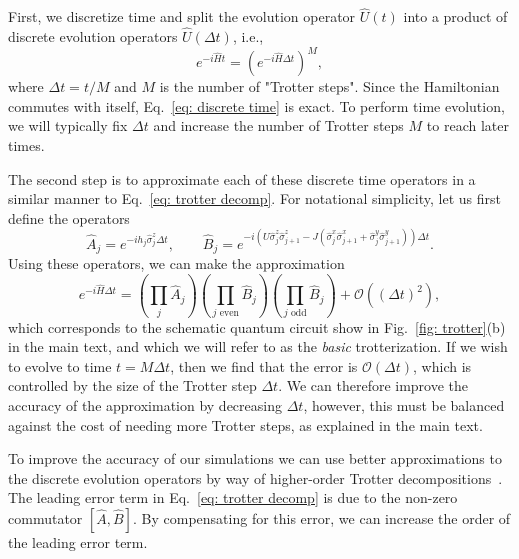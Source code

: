 \documentclass[twocolumn,showpacs,preprintnumbers,nofootinbib,amsmath,aps,pra,longbibliography,amssymb,superscriptaddress]{revtex4-1}
\begin{document}
First, we discretize time and split the evolution operator $\hat{U}(t)$ into a product of discrete evolution operators $\hat{U}(\Delta t)$, i.e.,
\begin{equation}\label{eq: discrete time}
e^{-i\hat{H} t} = \left( e^{-i\hat{H} \Delta t} \right)^M,
\end{equation}
where $\Delta t = t/M$ and $M$ is the number of "Trotter steps". Since the Hamiltonian commutes with itself, Eq.~\eqref{eq: discrete time} is exact. To perform time evolution, we will typically fix $\Delta t$ and increase the number of Trotter steps $M$ to reach later times.

The second step is to approximate each of these discrete time operators in a similar manner to Eq.~\eqref{eq: trotter decomp}. For notational simplicity, let us first define the operators
\begin{equation}
\hat{A}_j = e^{-i h_j \hat{\sigma}^z_j \Delta t}, \qquad \hat{B}_j = e^{-i(U\hat{\sigma}^z_j\hat{\sigma}^z_{j+1}-J(\hat{\sigma}^x_j\hat{\sigma}^x_{j+1} +\hat{\sigma}^y_j\hat{\sigma}^y_{j+1}))\Delta t}.
\end{equation}
Using these operators, we can make the approximation
\begin{equation}
e^{-i\hat{H}\Delta t} =  \left( \prod_{j} \hat{A}_j \right) \left( \prod_{j \text{ even}} \hat{B}_j \right) \left( \prod_{j \text{ odd}} \hat{B}_j \right) + \mathcal{O}((\Delta t)^2),
\end{equation}
which corresponds to the schematic quantum circuit show in Fig.~\ref{fig: trotter}(b) in the main text, and which we will refer to as the \emph{basic} trotterization. If we wish to evolve to time $t = M\Delta t$, then we find that the error is $\mathcal{O}(\Delta t)$, which is controlled by the size of the Trotter step $\Delta t$. We can therefore improve the accuracy of the approximation by decreasing $\Delta t$, however, this must be balanced against the cost of needing more Trotter steps, as explained in the main text.



To improve the accuracy of our simulations we can use better approximations to the discrete evolution operators by way of higher-order Trotter decompositions~\cite{Hatano2005}. The leading error term in Eq.~\eqref{eq: trotter decomp} is due to the non-zero commutator $[\hat{A},\hat{B}]$. By compensating for this error, we can increase the order of the leading error term. 
\end{document}
